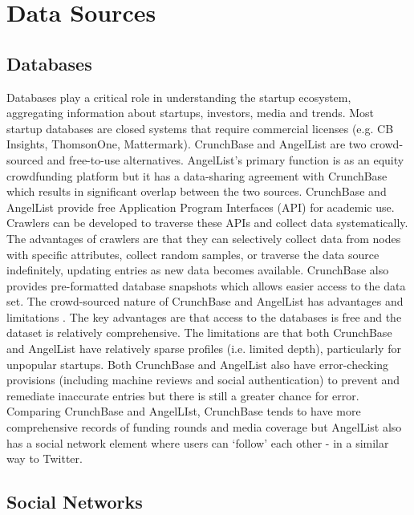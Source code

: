 \chapter{Data Sources}
\label{appendix:data_sources}

\section{Databases}

Databases play a critical role in understanding the startup ecosystem, aggregating information about startups, investors, media and trends. Most startup databases are closed systems that require commercial licenses (e.g. CB Insights, ThomsonOne, Mattermark). CrunchBase and AngelList are two crowd-sourced and free-to-use alternatives. AngelList’s primary function is as an equity crowdfunding platform but it has a data-sharing agreement with CrunchBase which results in significant overlap between the two sources. CrunchBase and AngelList provide free Application Program Interfaces (API) for academic use. Crawlers can be developed to traverse these APIs and collect data systematically. The advantages of crawlers are that they can selectively collect data from nodes with specific attributes, collect random samples, or traverse the data source indefinitely, updating entries as new data becomes available. CrunchBase also provides pre-formatted database snapshots which allows easier access to the data set. The crowd-sourced nature of CrunchBase and AngelList has advantages and limitations . The key advantages are that access to the databases is free and the dataset is relatively comprehensive. The limitations are that both CrunchBase and AngelList have relatively sparse profiles (i.e. limited depth), particularly for unpopular startups. Both CrunchBase and AngelList also have error-checking provisions (including machine reviews and social authentication) to prevent and remediate inaccurate entries but there is still a greater chance for error. Comparing CrunchBase and AngelLIst, CrunchBase tends to have more comprehensive records of funding rounds \cite{cheng2016} and media coverage but AngelList also has a social network element where users can `follow’ each other - in a similar way to Twitter.

\section{Social Networks}

